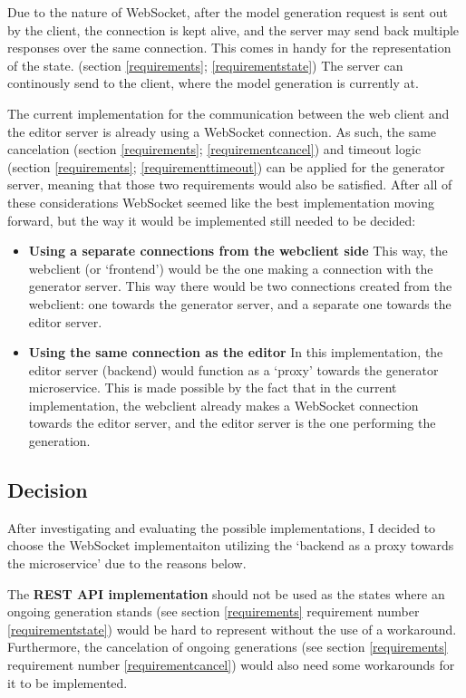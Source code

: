 	Due to the nature of WebSocket, after the model generation request is sent out by the client,
	the connection is kept alive, and the server may send back multiple responses over the same connection.
	This comes in handy for the representation of the state. (section \ref{requirements}; \ref{requirementstate})
	The server can continously send to the client,
	where the model generation is currently at. 

	The current implementation for the communication between the web client and the editor server is already using a WebSocket connection.
	As such, the same cancelation (section \ref{requirements}; \ref{requirementcancel}) and timeout logic (section \ref{requirements}; \ref{requirementtimeout})
	can be applied for the generator server, meaning that those two requirements would also be satisfied.
	After all of these considerations WebSocket seemed like the best implementation moving forward, but the way it would be implemented
	still needed to be decided:

	\begin{itemize}
			\item \textbf{Using a separate connections from the webclient side}
			This way, the webclient (or `frontend') would be the one making a connection with the generator server. This way
			there would be two connections created from the webclient: one towards the generator server, and a separate one 
			towards the editor server.

			\item \textbf{Using the same connection as the editor}
			In this implementation, the editor server (backend) would function as a `proxy' towards the generator microservice. This is made possible 
			by the fact that in the current implementation, the webclient already makes a WebSocket connection towards the editor server, and 
			the editor server is the one performing the generation.
	\end{itemize}

\subsection{Decision} \label{archdecision}
	After investigating and evaluating the possible implementations, I decided to choose the WebSocket implementaiton 
	utilizing the `backend as a proxy towards the microservice' due to the reasons below.

	The \textbf{REST API implementation} should not be used as the states where an ongoing generation stands (see section \ref{requirements} 
	requirement number \ref{requirementstate}) would be hard to represent
	without the use of a workaround. Furthermore, the cancelation of ongoing generations (see section \ref{requirements} 
	requirement number \ref{requirementcancel}) would also need some workarounds for it to be implemented.

